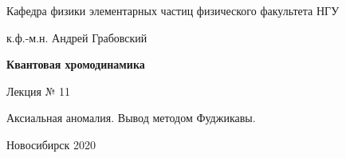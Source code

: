 \documentclass[12pt,pagesize,paper=landscape,paper=192mm:108mm]{scrbook}
\begin{document}
\begin{titlepage}
\begin{center}
    Кафедра физики элементарных частиц физического факультета НГУ
    \medskip

    \Large
    к.ф.-м.н. Андрей Грабовский
    
    \bigskip

    \huge
    \textbf{Квантовая хромодинамика}
    \bigskip

    \Large
    Лекция № 11
    \vfill

    \normalsize
    \begin{minipage}{0.65\linewidth}
      Аксиальная аномалия. Вывод методом Фуджикавы.
    \end{minipage}
    \vfill

    \normalsize \ccbysa\hspace{0.5em}  Новосибирск 2020
  \end{center}
\end{titlepage}
\end{document}
